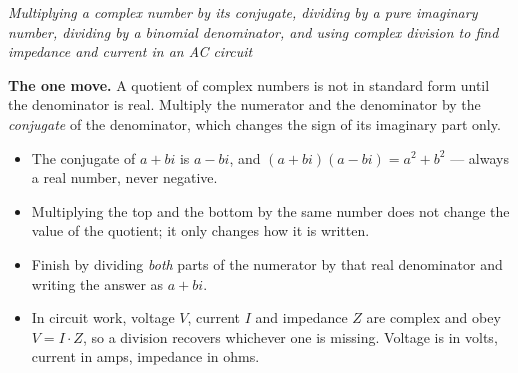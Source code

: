 \documentclass[12pt]{article}
\begin{document}

\begin{center}
\textit{Multiplying a complex number by its conjugate, dividing by a pure
imaginary number, dividing by a binomial denominator, and using complex
division to find impedance and current in an AC circuit}
\end{center}

\noindent\small
\textbf{The one move.} A quotient of complex numbers is not in standard form
until the denominator is real. Multiply the numerator and the denominator by
the \emph{conjugate} of the denominator, which changes the sign of its
imaginary part only.
\begin{itemize}[leftmargin=1.1cm, itemsep=1pt, topsep=2pt]
  \item The conjugate of $a + bi$ is $a - bi$, and
        $(a+bi)(a-bi) = a^2 + b^2$ --- always a real number, never negative.
  \item Multiplying the top and the bottom by the same number does not change
        the value of the quotient; it only changes how it is written.
  \item Finish by dividing \emph{both} parts of the numerator by that real
        denominator and writing the answer as $a + bi$.
  \item In circuit work, voltage $V$, current $I$ and impedance $Z$ are complex
        and obey $V = I \cdot Z$, so a division recovers whichever one is
        missing. Voltage is in volts, current in amps, impedance in ohms.
\end{itemize}
\normalsize

\vspace{0.15cm}





\end{document}
